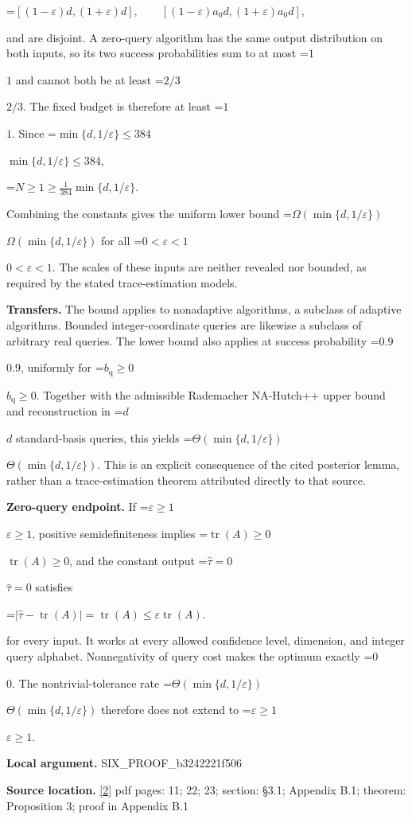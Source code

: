 \documentclass[10pt,a4paper]{article}
\newcommand{\AtlasMath}[1]{\par\begingroup\centering\setbox0=\hbox{$\displaystyle #1$}\ifdim\wd0>1.4\linewidth\typeout{ATLAS WIDE FORMULA: \the\wd0}\fi\ifdim\wd0>\linewidth\resizebox{\linewidth}{!}{\box0}\else\box0\fi\par\endgroup}
\newcommand{\AtlasInlineMath}[1]{\begingroup\setbox0=\hbox{$#1$}\ifdim\wd0>.4\linewidth\endgroup\AtlasMath{#1}\else\endgroup$#1$\fi}
\begin{document}
\AtlasMath{[(1-\varepsilon)d,(1+\varepsilon)d],\qquad [(1-\varepsilon)a_0d,(1+\varepsilon)a_0d],}

and are disjoint. A zero-query algorithm has the same output distribution on both inputs, so its two success probabilities sum to at most \AtlasInlineMath{1} and cannot both be at least \AtlasInlineMath{2/3}. The fixed budget is therefore at least \AtlasInlineMath{1}. Since \AtlasInlineMath{\min\{d,1/\varepsilon\}\le384},

\AtlasMath{N\ge1\ge\frac1{384}\min\{d,1/\varepsilon\}.}

Combining the constants gives the uniform lower bound \AtlasInlineMath{\Omega(\min\{d,1/\varepsilon\})} for all \AtlasInlineMath{0<\varepsilon<1}. The scales of these inputs are neither revealed nor bounded, as required by the stated trace-estimation models.

\textbf{Transfers.} The bound applies to nonadaptive algorithms, a subclass of adaptive algorithms. Bounded integer-coordinate queries are likewise a subclass of arbitrary real queries. The lower bound also applies at success probability \AtlasInlineMath{0.9}, uniformly for \AtlasInlineMath{b_{\mathrm q}\ge0}. Together with the admissible Rademacher NA-Hutch++ upper bound and reconstruction in \AtlasInlineMath{d} standard-basis queries, this yields \AtlasInlineMath{\Theta(\min\{d,1/\varepsilon\})}. This is an explicit consequence of the cited posterior lemma, rather than a trace-estimation theorem attributed directly to that source.

\textbf{Zero-query endpoint.} If \AtlasInlineMath{\varepsilon\ge1}, positive semidefiniteness implies \AtlasInlineMath{\operatorname{tr}(A)\ge0}, and the constant output \AtlasInlineMath{\widehat\tau=0} satisfies

\AtlasMath{|\widehat\tau-\operatorname{tr}(A)|=\operatorname{tr}(A)\le\varepsilon\operatorname{tr}(A).}

for every input. It works at every allowed confidence level, dimension, and integer query alphabet. Nonnegativity of query cost makes the optimum exactly \AtlasInlineMath{0}. The nontrivial-tolerance rate \AtlasInlineMath{\Theta(\min\{d,1/\varepsilon\})} therefore does not extend to \AtlasInlineMath{\varepsilon\ge1}.

\textbf{Local argument.} SIX\_\allowbreak{}PROOF\_\allowbreak{}b3242221f506

\textbf{Source location.} \href{https://arxiv.org/pdf/2402.09379v3}{[2]} pdf pages: 11; 22; 23; section: §3.1; Appendix B.1; theorem: Proposition 3; proof in Appendix B.1
\end{document}

